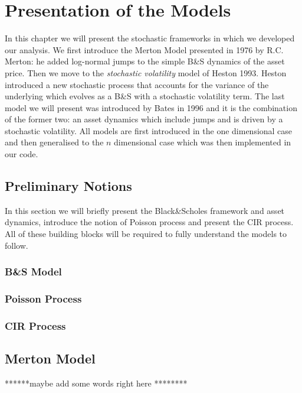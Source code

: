 \chapter{Presentation of the Models}
\label{chpr:models}
In this chapter we will present the stochastic frameworks in which we developed our analysis. We first introduce the Merton Model presented in 1976 by R.C. Merton: he added log-normal jumps to the simple B\&S dynamics of the asset price. Then we move to the \textit{stochastic volatility} model of Heston 1993. Heston introduced a new stochastic process that accounts for the variance of the underlying which evolves as a B\&S  with a stochastic volatility term.
The last model we will present was introduced by Bates in 1996 and it is the combination of the former two: an asset dynamics which include jumps and is driven by a stochastic volatility.
All models are first introduced in the one dimensional case and then generalised to the $n$ dimensional case which was then implemented in our code.

\bigskip

\section{Preliminary Notions}

In this section we will briefly present the Black\&Scholes framework and asset dynamics, introduce the notion of Poisson process and present the 
CIR process. All of these building blocks will be required to fully understand the models to follow.


\subsection{B\&S Model}

\subsection{Poisson Process}

\subsection{CIR Process}

\bigskip
\section{Merton Model}

 ******maybe add some words right here ********
